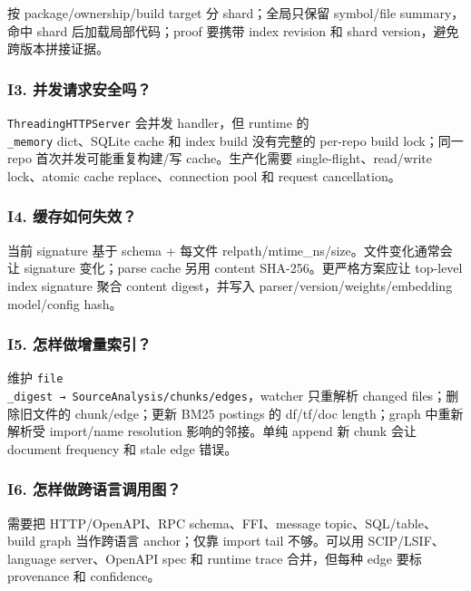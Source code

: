 \documentclass[UTF8,12pt,openany]{ctexbook}
\begin{document}
按 package/ownership/build target 分 shard；全局只保留 symbol/file summary，命中 shard 后加载局部代码；proof 要携带 index revision 和 shard version，避免跨版本拼接证据。\par

\subsubsection{I3. 并发请求安全吗？}

\texttt{ThreadingHTTPServer} 会并发 handler，但 runtime 的 \texttt{\\_memory} dict、SQLite cache 和 index build 没有完整的 per-repo build lock；同一 repo 首次并发可能重复构建/写 cache。生产化需要 single-flight、read/write lock、atomic cache replace、connection pool 和 request cancellation。\par

\subsubsection{I4. 缓存如何失效？}

当前 signature 基于 schema + 每文件 relpath/mtime\_ns/size。文件变化通常会让 signature 变化；parse cache 另用 content SHA-256。更严格方案应让 top-level index signature 聚合 content digest，并写入 parser/version/weights/embedding model/config hash。\par

\subsubsection{I5. 怎样做增量索引？}

维护 \texttt{file\\_digest → SourceAnalysis/chunks/edges}，watcher 只重解析 changed files；删除旧文件的 chunk/edge；更新 BM25 postings 的 df/tf/doc length；graph 中重新解析受 import/name resolution 影响的邻接。单纯 append 新 chunk 会让 document frequency 和 stale edge 错误。\par

\subsubsection{I6. 怎样做跨语言调用图？}

需要把 HTTP/OpenAPI、RPC schema、FFI、message topic、SQL/table、build graph 当作跨语言 anchor；仅靠 import tail 不够。可以用 SCIP/LSIF、language server、OpenAPI spec 和 runtime trace 合并，但每种 edge 要标 provenance 和 confidence。\par
\end{document}
